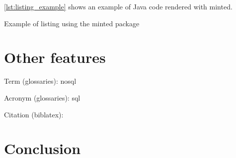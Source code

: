 \autoref{lst:listing_example} shows an example of Java code rendered with minted.

\begin{listing}[H]
	\caption{Example of listing using the minted package}
	\label{lst:listing_example}
\end{listing}

\section{Other features}

Term (glossaries): \gls{nosql}

Acronym (glossaries): \gls{sql}

Citation (biblatex): \cite{paper_millwheel}

\section{Conclusion}

\blindtext
